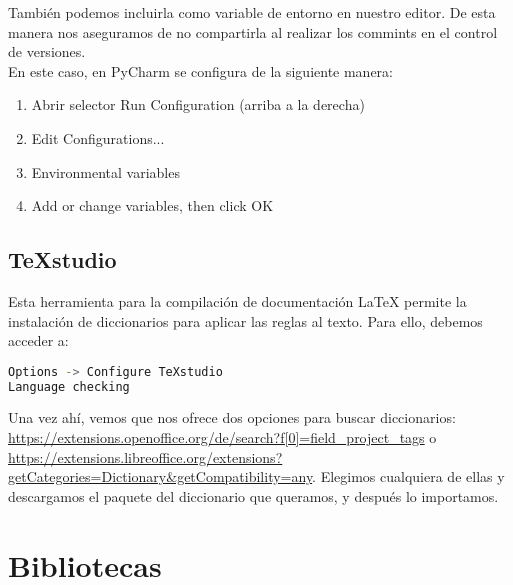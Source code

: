También podemos incluirla como variable de entorno en nuestro editor. De esta manera nos aseguramos de no compartirla al realizar los commints en el control de versiones.
\\
En este caso, en PyCharm se configura de la siguiente manera:
\begin{enumerate}
\item Abrir selector Run Configuration (arriba a la derecha)
\item Edit Configurations...
\item Environmental variables
\item Add or change variables, then click OK 
\end{enumerate}
  
\subsection{\TeX studio}
Esta herramienta para la compilación de documentación \LaTeX{} permite la instalación de diccionarios para aplicar las reglas al texto. Para ello, debemos acceder a:

\renewcommand{\lstlistingname}{Configure \TeX studio}%
\renewcommand{\lstlistlistingname}{List of \lstlistingname s}
\begin{lstlisting}[language=bash,caption={Añadir diccionario}]
Options -> Configure TeXstudio
Language checking
\end{lstlisting}

Una vez ahí, vemos que nos ofrece dos opciones para buscar diccionarios: \url{https://extensions.openoffice.org/de/search?f[0]=field_project_tags} o \url{https://extensions.libreoffice.org/extensions?getCategories=Dictionary&getCompatibility=any}. Elegimos cualquiera de ellas y descargamos el paquete del diccionario que queramos, y después lo importamos.


\section{Bibliotecas}

